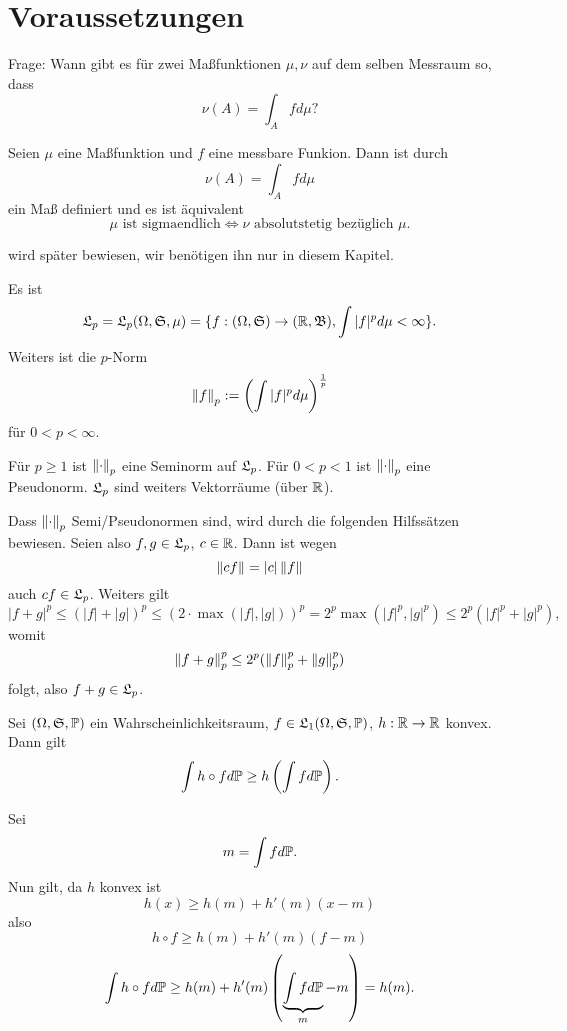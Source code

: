\section{Voraussetzungen}
	Frage: Wann gibt es für zwei Maßfunktionen $\mu, \nu$ auf dem selben Messraum so, dass
	\[ \nu(A) = \int_A fd\mu? \]
	\begin{satz}
		Seien $\mu$ eine Maßfunktion und $f$ eine messbare Funkion. Dann ist durch
		\[ \nu(A) = \int_A fd\mu \]
		ein Maß definiert und es ist äquivalent
		\[ \mu \text{ ist sigmaendlich} \Leftrightarrow \nu \text{ absolutstetig bezüglich }\mu. \]
	\end{satz}
	
	\begin{bew}
		wird später bewiesen, wir benötigen ihn nur in diesem Kapitel.	
	\end{bew}

	\begin{defi}
		Es ist
		\[ \L_p=\L_p(\Omega, \S, \mu) = \{f: (\Omega, \S)\to(\R, \B), \int |f|^pd\mu <\infty\}. \]
		Weiters ist die $p$-Norm
		\[ \norm{f}_p:=\left(\int|f|^pd\mu\right)^\frac{1}{p} \]
		für $0<p<\infty$.
	\end{defi}

	\begin{satz}
		Für $p\ge 1$ ist $\norm{\cdot}_p$ eine Seminorm auf $\L_p$. Für $0<p<1$ ist $\norm{\cdot}_p$ eine Pseudonorm. $\L_p$ sind weiters Vektorräume (über $\R$). 
	\end{satz}

	\begin{bew}
		Dass $\norm{\cdot}_p$ Semi/Pseudonormen sind, wird durch die folgenden Hilfssätzen bewiesen.\newline
		Seien also $f,g\in\L_p$, $c\in\R$. Dann ist wegen
		\[ \norm{cf}=|c|\norm{f} \]
		auch $cf\in\L_p$. Weiters gilt
		\[ |f+g|^p\le(|f|+|g|)^p\le(2\cdot\max(|f|, |g|))^p = 2^p\max(|f|^p, |g|^p)\le 2^p(|f|^p+|g|^p), \]
		womit 
		\[\norm{f+g}_p^p\le 2^p(\norm{f}_p^p+\norm{g}_p^p)\]
		folgt, also $f+g\in\L_p$. 
	\end{bew}

	\begin{lemma}
		Sei $(\Omega, \S, \P)$ ein Wahrscheinlichkeitsraum, $f\in\L_1(\Omega, \S, \P)$, $h: \R\to\R$ konvex. Dann gilt
		\[ \int h\circ f d\P\ge h\left(\int fd\P\right). \]
	\end{lemma}

	\begin{bew}
		Sei 
		\[ m=\int fd\P. \]
		Nun gilt, da $h$ konvex ist
		\[ h(x)\ge h(m)+h'(m)(x-m) \]
		also
		\[ h\circ f\ge h(m)+h'(m)(f-m) \]
		\[ \int h\circ fd\P\ge h(m)+h'(m)\left(\underbrace{\int fd\P}_{m} - m\right) = h(m). \]
	\end{bew}

